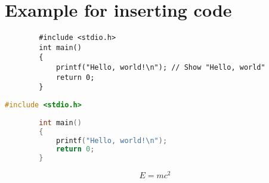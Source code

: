 \documentclass{article}
\begin{document}
	
	\section{Example for inserting code}
	
	\begin{verbatim}
		#include <stdio.h>
		int main() 
		{
			printf("Hello, world!\n"); // Show "Hello, world"
			return 0;
		}
	\end{verbatim}
	
	
	\begin{lstlisting}[language=C, caption=My C Code, basicstyle=\ttfamily\footnotesize,
		breaklines=true,
		breakautoindent=true]
		#include <stdio.h>
		
		int main() 
		{
			printf("Hello, world!\n");
			return 0;
		}
	\end{lstlisting}
	
	\begin{equation}
		E = mc^2
	\end{equation}
	
\end{document}
